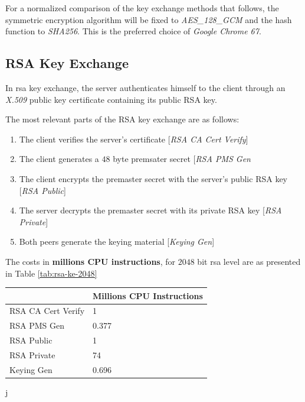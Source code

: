 \documentclass{llncs}
\begin{document}
For a normalized comparison of the key exchange methods that follows, the symmetric encryption algorithm
will be fixed to \textit{AES\_128\_GCM} and the hash function to \textit{SHA256}. This is the preferred choice
of \textit{Google Chrome 67}.


\subsection{RSA Key Exchange}

In \gls{rsa} key exchange, the server authenticates himself to the client through
an \textit{X.509} public key certificate containing its public RSA key.

The most relevant parts of the RSA key exchange are as follows:

\begin{enumerate}
  \item The client verifies the server's certificate [\textit{RSA CA Cert Verify}]
\item The client generates a $48$ byte premsater secret [\textit{RSA PMS Gen}
  \item The client encrypts the premaster secret with the server's public RSA key [\textit{RSA Public}]
  \item The server decrypts the premaster secret with its private RSA key [\textit{RSA Private}]
  \item Both peers generate the keying material [\textit{Keying Gen}]
\end{enumerate}

The costs in \textbf{millions CPU instructions}, for $2048$ bit \gls{rsa} level are as
presented in Table \ref{tab:rsa-ke-2048}

\begin{table}[]
\begin{tabular}{|l|l|}
\hline
                   & Millions CPU Instructions \\ \hline
RSA CA Cert Verify & 1                         \\ \hline
RSA PMS Gen        & 0.377                     \\ \hline
RSA Public         & 1                         \\ \hline
RSA Private        & 74                        \\ \hline
Keying Gen         & 0.696                     \\ \hline
\end{tabular}
\end{table}j
\end{document}
